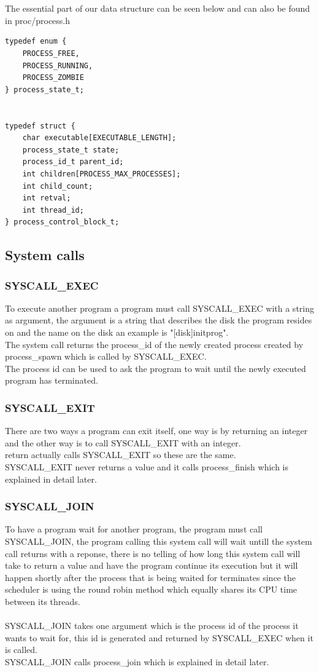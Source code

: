 \documentclass[a4paper,12pt,danish]{report}
\begin{document}
\\
\\
The essential part of our data structure can be seen below and can also be found in proc/process.h
\begin{verbatim}
typedef enum {
    PROCESS_FREE,
    PROCESS_RUNNING,
    PROCESS_ZOMBIE
} process_state_t;


typedef struct {
    char executable[EXECUTABLE_LENGTH];
    process_state_t state;
    process_id_t parent_id;
    int children[PROCESS_MAX_PROCESSES];
    int child_count;
    int retval;
    int thread_id;
} process_control_block_t;
\end{verbatim}
\subsection{System calls}
\subsubsection{SYSCALL\_EXEC}
To execute another program a program must call SYSCALL\_EXEC with a string as argument, the argument is a string that describes the disk the program resides on and the name on the disk an example is "[disk]initprog".
\\
The system call returns the process\_id of the newly created process created by process\_spawn which is called by SYSCALL\_EXEC.
\\
The process id can be used to ask the program to wait until the newly executed program has terminated.
\subsubsection{SYSCALL\_EXIT}
There are two ways a program can exit itself, one way is by returning an integer and the other way is to call SYSCALL\_EXIT with an integer.
\\
return actually calls SYSCALL\_EXIT so these are the same.
\\
SYSCALL\_EXIT never returns a value and it calls process\_finish which is explained in detail later.
\subsubsection{SYSCALL\_JOIN}
To have a program wait for another program, the program must call SYSCALL\_JOIN, the program calling this system call will wait untill the system call returns with a reponse, there is no telling of how long this system call will take to return a value and have the program continue its execution but it will happen shortly after the process that is being waited for terminates since the scheduler is using the round robin method which equally shares its CPU time between its threads.
\\
\\
SYSCALL\_JOIN takes one argument which is the process id of the process it wants to wait for, this id is generated and returned by SYSCALL\_EXEC when it is called.
\\
SYSCALL\_JOIN calls process\_join which is explained in detail later. 
\newpage
\end{document}
